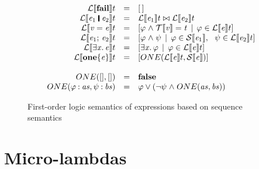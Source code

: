 \documentclass[acmsmall,review,dvipsnames]{acmart}
\newcommand{\Varid}[1]{\mathit{#1}}
\newcommand{\vb}{\; \ensuremath{\mathop{\mid}} \;}    %
\newcommand{\lcompr}[2]{[ #1 \vb #2 ]}
\newcommand{\semfun}[1]{\mathcal{#1}}
\newcommand{\folapp}[2]{\semfun{L}\llbracket #1 \rrbracket #2}
\newcommand{\sfolapp}[2]{\semfun{S}\llbracket #1 \rrbracket #2}
\newcommand{\termapp}[2]{\semfun{T}\llbracket #1 \rrbracket #2}
\begin{document}
\begin{figure}
$$\begin{array}{rcll}
  \folapp{\ensuremath{\textbf{fail}}}{t} & = & \ensuremath{[\mskip1.5mu \mskip1.5mu]} \\
  \folapp{\ensuremath{\Varid{e}_{\mathrm{1}}\;\rule[-0.1em]{0.15em}{0.75em}\;\Varid{e}_{\mathrm{2}}}}{t} & = &
    \folapp{\ensuremath{\Varid{e}_{\mathrm{1}}}}{t} \ensuremath{\bowtie} \folapp{\ensuremath{\Varid{e}_{\mathrm{2}}}}{t} \\
  \folapp{\ensuremath{\Varid{v}\mathrel{=}\Varid{e}}}{t} & = &
    \lcompr{\ensuremath{\varphi\mathrel{\wedge}\termapp{\Varid{v}}\mathrel{=}\Varid{t}}}
           {\ensuremath{\varphi} \in \folapp{\ensuremath{\Varid{e}}}{t}} \\
  \folapp{\ensuremath{\Varid{e}_{\mathrm{1}};\,\Varid{e}_{\mathrm{2}}}}{t} & = &
    \lcompr{\ensuremath{\varphi\mathrel{\wedge}\psi}}
           {\ensuremath{\varphi} \in \sfolapp{\ensuremath{\Varid{e}_{\mathrm{1}}}}, ~~ \ensuremath{\psi} \in \folapp{\ensuremath{\Varid{e}_{\mathrm{2}}}}{t}} \\
  \folapp{\ensuremath{\exists\Varid{x}.\,\Varid{e}}}{t} & = &
    \lcompr{\ensuremath{\exists\Varid{x}.\,\varphi}}
           {\ensuremath{\varphi} \in \folapp{\ensuremath{\Varid{e}}}{t}} \\
  \folapp{\ensuremath{\textbf{one}\{\Varid{e}\}}}{t} & = & [ONE(\folapp{\ensuremath{\Varid{e}}}{t},\sfolapp{\ensuremath{\Varid{e}}})] \\
~ \\
  ONE([],[]) & = & \ensuremath{\textbf{false}} \\
  ONE(\ensuremath{\varphi\mathbin{:}\Varid{as}},\ensuremath{\psi\mathbin{:}\Varid{bs}}) & = & \ensuremath{\varphi} \vee (\neg{}\ensuremath{\psi} \ensuremath{\mathrel{\wedge}} ONE(\ensuremath{\Varid{as}},\ensuremath{\Varid{bs}})) \\
  \end{array}
$$
\caption{First-order logic semantics of expressions based on sequence semantics}
\end{figure}

\clearpage
\section{Micro-lambdas}

\end{document}
